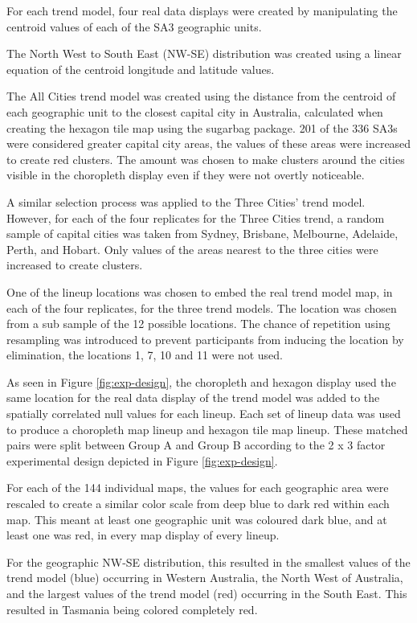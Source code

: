 \documentclass{monashthesis}
\begin{document}
For each trend model, four real data displays were created by manipulating the centroid values of each of the SA3 geographic units.

The North West to South East (NW-SE) distribution was created using a linear equation of the centroid longitude and latitude values.

The All Cities trend model was created using the distance from the centroid of each geographic unit to the closest capital city in Australia, calculated when creating the hexagon tile map using the sugarbag \autocite{sugarbag} package.
201 of the 336 SA3s were considered greater capital city areas, the values of these areas were increased to create red clusters. The amount was chosen to make clusters around the cities visible in the choropleth display even if they were not overtly noticeable.

A similar selection process was applied to the Three Cities' trend model. However, for each of the four replicates for the Three Cities trend, a random sample of capital cities was taken from Sydney, Brisbane, Melbourne, Adelaide, Perth, and Hobart. Only values of the areas nearest to the three cities were increased to create clusters.

One of the lineup locations was chosen to embed the real trend model map, in each of the four replicates, for the three trend models.
The location was chosen from a sub sample of the 12 possible locations. The chance of repetition using resampling was introduced to prevent participants from inducing the location by elimination, the locations 1, 7, 10 and 11 were not used.

As seen in Figure \ref{fig:exp-design}, the choropleth and hexagon display used the same location for the real data display of the trend model was added to the spatially correlated null values for each lineup.
Each set of lineup data was used to produce a choropleth map lineup and hexagon tile map lineup. These matched pairs were split between Group A and Group B according to the 2 x 3 factor experimental design depicted in Figure \ref{fig:exp-design}.

For each of the 144 individual maps, the values for each geographic area were rescaled to create a similar color scale from deep blue to dark red within each map.
This meant at least one geographic unit was coloured dark blue, and at least one was red, in every map display of every lineup.

For the geographic NW-SE distribution, this resulted in the smallest values of the trend model (blue) occurring in Western Australia, the North West of Australia, and the largest values of the trend model (red) occurring in the South East. This resulted in Tasmania being colored completely red.
\end{document}
